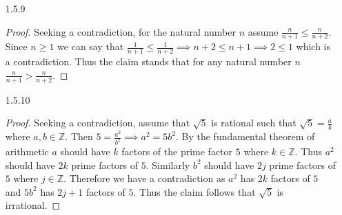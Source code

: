 \documentclass[11pt]{amsart}
\theoremstyle{definition}
\begin{document}
\begin{itemize}
\begin{itemize}
    \item[b.] \begin{proof}
        Let $a$ and $b$ be positive integers. We'll prove that $a+1\mid b$ and $b\mid b+3$ if and only if $a=2$ and $b=3$. \\
        ($\implies$) Assume that $a+1\mid b$ and $b\mid b+3$ so that $b=(a+1)k$ and $b+3=bj$ for some $k,j\in\mathbb{Z}$. Then $(a+1)k+3=(a+1)kj\implies ak+k+3=akj+kj\implies 3=ak(j-1)+k(j-1)\implies 3=h(a+1)\implies a+1\mid 3$. This requires $a+1$ to be $1$ or $3$, where $1$ is impossible since it would require $a=0$, therefore $a=2$. Thus $b=3k$ which means $3\mid b$ and $3=b(j-1)=bh$ where $b\mid 3$ which means that $b=3$. \\
        ($\impliedby$) Now assume, for the reverse direction, that $a=2$ and $b=3$. This means $a+1=3\implies a+1\mid 3$ which means $a+1\mid b$ and $b\mid b+3$ since $3\mid 6$. \\
        Thus we've proved that $a+1\mid b$ and $b\mid b+3$ if and only if $a=2$ and $b=3$ by showing their implications in both directions are true.
    \end{proof}

\end{itemize}

\item[1.5.9] \begin{proof}
        Seeking a contradiction, for the natural number $n$ assume $\frac n{n+1}\le \frac n{n+2}$. Since $n\ge 1$ we can say that $\frac 1{n+1}\le \frac 1{n+2}\implies n+2\le n+1\implies 2\le 1$ which is a contradiction. Thus the claim stands that for any natural number $n$ $\frac n{n+1}> \frac n{n+2}$.
    \end{proof}

\item[1.5.10] \begin{proof}
        Seeking a contradiction, assume that $\sqrt{5}$ is rational such that $\sqrt{5}=\frac ab$ where $a,b\in\mathbb{Z}$. Then $5=\frac {a^2}{b^2}\implies a^2=5b^2$. By the fundamental theorem of arithmetic $a$ should have $k$ factors of the prime factor $5$ where $k\in\mathbb{Z}$. Thus $a^2$ should have $2k$ prime factors of $5$. Similarly $b^2$ should have $2j$ prime factors of $5$ where $j\in\mathbb{Z}$. Therefore we have a contradiction as $a^2$ has $2k$ factors of $5$ and $5b^2$ has $2j+1$ factors of $5$. Thus the claim follows that $\sqrt{5}$ is irrational.
    \end{proof}


\end{itemize}
\end{document}
